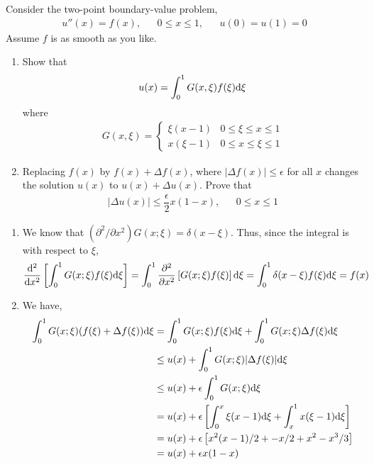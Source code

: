 \documentclass[10pt]{article}
\begin{document}
\begin{problem}
Consider the two-point boundary-value problem,
\begin{align*}
    u''(x) = f(x), && 0\leq x\leq 1,&& u(0) = u(1) = 0
\end{align*}
Assume \( f \) is as smooth as you like.
\begin{enumerate}[label=(\alph*)]
    \item Show that
    \begin{align*}
        u(x) = \int_0^1 G(x,\xi)f(\xi)\d \xi
    \end{align*}
    where
    \begin{align*}
        G(x,\xi) = \begin{cases}
            \xi(x-1) & 0\leq \xi \leq x \leq 1 \\
            x(\xi-1) & 0\leq x\leq \xi \leq 1
        \end{cases}
    \end{align*}
    \item Replacing \( f(x) \)  by \( f(x) + \Delta f(x) \), where \( |\Delta f(x)| \leq \epsilon \) for all \( x \) changes the solution \( u(x) \) to \( u(x) + \Delta u(x) \). Prove that
    \begin{align*}
        |\Delta u(x)| \leq \dfrac{\epsilon}{2} x(1-x), && 0\leq x\leq 1
    \end{align*}
\end{enumerate}
\end{problem}

\begin{solution}[Solution]
\begin{enumerate}[label=(\alph*),nolistsep]
\item We know that \( (\partial^2 / \partial x^2) G(x;\xi) = \delta(x-\xi) \). Thus, since the integral is with respect to \( \xi \),
\begin{align*}
     \dd[2]{}{x} \left[\int_0^1 G(x;\xi) f(\xi) \d \xi\right]
    = \int_0^1 \pp[2]{}{x}\left[ G(x;\xi) f(\xi) \right] \d \xi
    = \int_0^1 \delta(x-\xi) f(\xi) \d \xi
    = f(x)
\end{align*}

\item
We have,
\begin{align*}
    \int_0^1 G(x;\xi) (f(\xi) + \Delta f(\xi)) \d \xi
    &= \int_0^1 G(x;\xi) f(\xi) \d \xi +\int_0^1 G(x;\xi) \Delta f(\xi) \d \xi
    \\&\leq u(x) + \int_0^1 G(x;\xi) |\Delta f(\xi)| \d \xi
    \\&\leq u(x) + \epsilon \int_0^1 G(x;\xi)\d \xi
    \\&= u(x) + \epsilon \left[ \int_0^x \xi(x-1)\d\xi + \int_x^1 x(\xi-1)\d \xi \right]
    \\&= u(x) + \epsilon \left[ x^2(x-1)/2 + -x/2+x^2-x^3/3 \right]
    \\&= u(x) + \epsilon x(1-x)
\end{align*}
\end{enumerate}
\end{solution}
\end{document}
